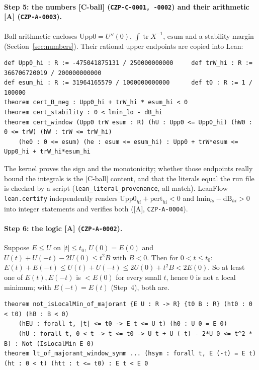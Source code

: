 \documentclass[10pt]{article}
\newcommand{\tier}[1]{\textsf{[#1]}}
\newcommand{\tA}{\tier{A}}
\newcommand{\tCb}{\textcolor{blue!60!black}{\textsf{[C-ball]}}}
\newcommand{\lean}[1]{\texttt{#1}}
\newcommand{\tr}{\operatorname{tr}}
\begin{document}
\paragraph{Step 5: the numbers \tCb{} (\texttt{CZP-C-0001, -0002}) and their arithmetic \tA{} (\texttt{CZP-A-0003}).} Ball arithmetic encloses $\mathrm{Upp0}=U''(0)$, $\int\tr X^{-1}$, $\mathrm{esum}$ and a stability margin (Section~\ref{sec:numbers}). Their rational upper endpoints are copied into Lean:
\begin{lstlisting}
def Upp0_hi : R := -475041875131 / 250000000000     def trW_hi : R := 366706720019 / 200000000000
def esum_hi : R := 31964165579 / 1000000000000      def t0 : R := 1 / 100000
theorem cert_B_neg : Upp0_hi + trW_hi * esum_hi < 0
theorem cert_stability : 0 < lmin_lo - dB_hi
theorem cert_window (Upp0 trW esum : R) (hU : Upp0 <= Upp0_hi) (hW0 : 0 <= trW) (hW : trW <= trW_hi)
    (he0 : 0 <= esum) (he : esum <= esum_hi) : Upp0 + trW*esum <= Upp0_hi + trW_hi*esum_hi
\end{lstlisting}
The kernel proves the sign and the monotonicity; whether those endpoints really bound the integrals is the \tCb{} content, and that the literals equal the run file is checked by a script (\texttt{lean\_literal\_provenance}, all match). LeanFlow \lean{lean.certify} independently renders $\mathrm{Upp0}_{hi}+\mathrm{pert}_{hi}<0$ and $\mathrm{lmin}_{lo}-\mathrm{dB}_{hi}>0$ into integer statements and verifies both (\tA{}, \texttt{CZP-A-0004}).

\paragraph{Step 6: the logic \tA{} (\texttt{CZP-A-0002}).} Suppose $E\le U$ on $|t|\le t_0$, $U(0)=E(0)$ and $U(t)+U(-t)-2U(0)\le t^2B$ with $B<0$. Then for $0<t\le t_0$: $E(t)+E(-t)\le U(t)+U(-t)\le2U(0)+t^2B<2E(0)$. So at least one of $E(t),E(-t)$ is $<E(0)$ for every small $t$, hence $0$ is not a local minimum; with $E(-t)=E(t)$ (Step~4), both are.
\begin{lstlisting}
theorem not_isLocalMin_of_majorant {E U : R -> R} {t0 B : R} (ht0 : 0 < t0) (hB : B < 0)
    (hEU : forall t, |t| <= t0 -> E t <= U t) (h0 : U 0 = E 0)
    (hU : forall t, 0 < t -> t <= t0 -> U t + U (-t) - 2*U 0 <= t^2 * B) : Not (IsLocalMin E 0)
theorem lt_of_majorant_window_symm ... (hsym : forall t, E (-t) = E t) (ht : 0 < t) (htt : t <= t0) : E t < E 0
\end{lstlisting}
\end{document}
